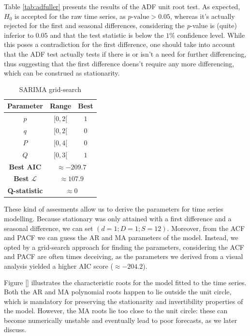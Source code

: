 \documentclass[conference]{IEEEtran}
\begin{document}
Table \ref{tab:adfuller} presents the results of the ADF unit root test. As expected, $H_0$ is accepted for the raw time series, as $p\text{-value}>0.05$, whereas it's actually rejected for the first and seasonal differences, considering the \textit{p}-value is (quite) inferior to $0.05$ and that the test statistic is below the $1\%$ confidence level. While this poses a contradiction for the first difference, one should take into account that the ADF test actually tests if there is or isn't a need for further differencing, thus suggesting that the first difference doens't require any more differencing, which can be construed as stationarity.

\begin{table}[btp]
    \caption{SARIMA grid-search}
    \centering
    \begin{tabular}{c|c|c}
        Parameter & Range & Best \\
        \hline
        $p$ & $[0,2[$ & $1$ \\
        $q$ & $[0,2[$ & $0$ \\
        $P$ & $[0,4[$ & $0$ \\
        $Q$ & $[0,3[$ & $1$ \\
        \hline
        \textbf{Best AIC}& \multicolumn{2}{c}{$\approx -209.7$} \\
        \textbf{Best $\mathcal{L}$}& \multicolumn{2}{c}{$\approx 107.9$} \\
        \textbf{Q-statistic}& \multicolumn{2}{c}{$\approx 0$}
    \end{tabular}
    \label{tab:grid-search}
\end{table}


These kind of assesments allow us to derive the parameters for time series modelling. Because stationary was only attained with a first difference and a seasonal difference, we can set $(d=1;D=1;S=12)$. Moreover, from the ACF and PACF we can guess the AR and MA parameters of the model. Instead, we opted by a grid-search approach for finding the parameters, considering the ACF and PACF are often times deceiving, as the parameters we derived from a visual analysis yielded a higher AIC score ($\approx -204.2$).


Figure \ref{} illustrates the characteristic roots for the model fitted to the time series. Both the AR and MA polynomial roots happen to lie outside the unit circle, which is mandatory for preserving the stationarity and invertibility properties of the model. However, the MA roots lie too close to the unit circle: these can become numerically unstable and eventually lead to poor forecasts, as we later discuss.
\end{document}
